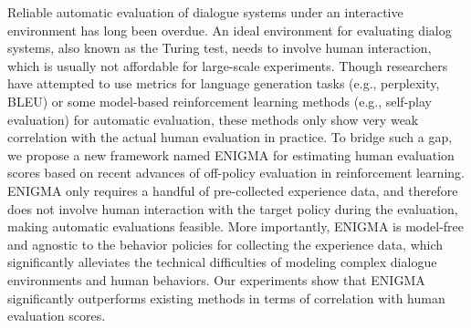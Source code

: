 Reliable automatic evaluation of dialogue systems under an interactive environment has long been overdue. An ideal environment for evaluating dialog systems, also known as the Turing test, needs to involve human interaction, which is usually not affordable for large-scale experiments. Though researchers have attempted to use metrics for language generation tasks (e.g., perplexity, BLEU) or some model-based reinforcement learning methods (e.g., self-play evaluation) for automatic evaluation, these methods only show very weak correlation with the actual human evaluation in practice. To bridge such a gap, we propose a new framework named ENIGMA for estimating human evaluation scores based on recent advances of off-policy evaluation in reinforcement learning. ENIGMA only requires a handful of pre-collected experience data, and therefore does not involve human interaction with the target policy during the evaluation, making automatic evaluations feasible. More importantly, ENIGMA is model-free and agnostic to the behavior policies for collecting the experience data, which significantly alleviates the technical difficulties of modeling complex dialogue environments and human behaviors. Our experiments show that ENIGMA significantly outperforms existing methods in terms of correlation with human evaluation scores.
